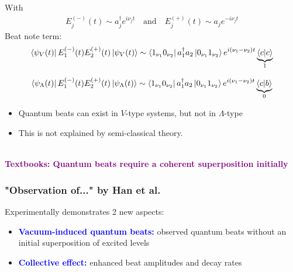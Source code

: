 \documentclass{beamer}
\theoremstyle{definition}
\begin{document}
\begin{frame}
With
\begin{align*}
E^{(-)}_j(t) \sim a_j^\dagger e^{i\nu_j t} \quad \text{and} \quad E^{(+)}_j(t) \sim a_j e^{-i\nu_j t} 
\end{align*}
Beat note term:
\begin{equation*}
\bra{\psi_V(t)} E_1^{(-)}(t) E_2^{(+)}(t)  \ket{\psi_V(t)} \sim \bra{1_{\nu_1} 0_{\nu_2}} a_1^\dagger a_2 \ket{0_{\nu_1} 1_{\nu_2}} e^{i(\nu_1 - \nu_2)t} \underbrace{\braket{c}}_{1}
\end{equation*}

\begin{equation*}
\bra{\psi_\Lambda(t)} E_1^{(-)}(t) E_2^{(+)}(t)  \ket{\psi_\Lambda(t)} \sim \bra{1_{\nu_1} 0_{\nu_2}} a_1^\dagger a_2 \ket{0_{\nu_1} 1_{\nu_2}} e^{i(\nu_1 - \nu_2)t} \underbrace{\bra{c}\ket{b}}_{0}
\end{equation*}



\begin{itemize}
	\item Quantum beats can exist in $V$-type systems, but not in $\Lambda$-type
	
	
	\item This is not explained by semi-classical theory.
\end{itemize}

$\,$\\


\textcolor{purple}{\textbf{Textbooks: Quantum beats require a coherent superposition initially}}


\end{frame}



\begin{frame}
	\frametitle{"Observation of..." by Han et al.}
	
	Experimentally demonstrates 2 new aspects:
	\begin{itemize}
		\item \textbf{\textcolor{blue}{Vacuum-induced quantum beats:}} observed quantum beats without an initial superposition of excited levels
		
		
		\item \textbf{\textcolor{blue}{Collective effect:}} enhanced beat amplitudes and decay rates
	\end{itemize}
	
	
	
	
	
	
\end{frame}
\end{document}
